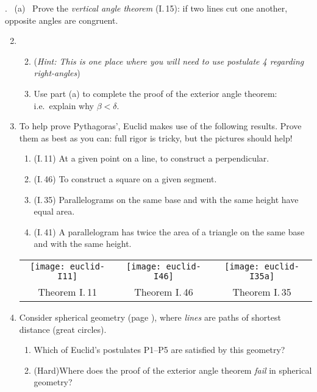 \begin{exercises}
	\hangindent{}. \ (a) \ Prove the \emph{vertical angle theorem} (I.\,15): if two lines cut one another, opposite angles are congruent.\vspace{-8pt}

	\begin{enumerate}\setcounter{enumi}{1}
	  \item[]\begin{enumerate}\setcounter{enumii}{1}
	    \item[](\emph{Hint: This is one place where you will need to use postulate 4 regarding right-angles})
	    \item Use part (a) to complete the proof of the exterior angle theorem: i.e.\ explain why $\beta<\delta$.
	  \end{enumerate}
	
		\item\label{ex:pythagexs} To help prove Pythagoras', Euclid makes use of the following results. Prove them as best as you can: full rigor is tricky, but the pictures should help!
		\begin{enumerate}
		  \item (I.\,11) At a given point on a line, to construct a perpendicular.
		  \item (I.\,46) To construct a square on a given segment.
		  \item (I.\,35) Parallelograms on the same base and with the same height have equal area.
		  \item (I.\,41) A parallelogram has twice the area of a triangle on the same base and with the same height.
		\end{enumerate}
		
		\begin{center}
			\begin{tabular}{ccc}
				\texttt{[image: euclid-I11]}
				&
				\texttt{[image: euclid-I46]}
				&
				\texttt{[image: euclid-I35a]}
				\\[-2pt]
				Theorem I.\,11
				&
				Theorem I.\,46
				&
				Theorem I.\,35
			\end{tabular}
		\end{center}
		
	  
	  \item Consider spherical geometry (page \pageref{pg:sphere}), where \emph{lines} are paths of shortest distance (great circles).
	 	\begin{enumerate}
	 	  \item Which of Euclid's postulates P1--P5 are satisfied by this geometry?
	  	\item (Hard)\lstsp Where does the proof of the exterior angle theorem \emph{fail} in spherical geometry? 
	 	\end{enumerate}
	  

\end{enumerate}
\end{exercises}

